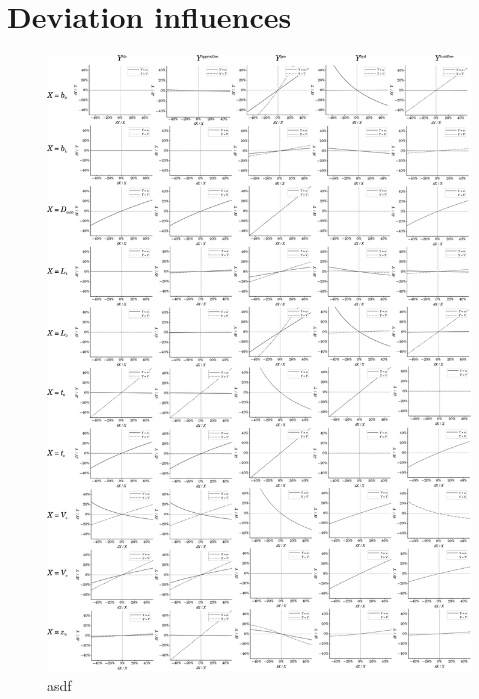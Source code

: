 \section*{Deviation influences}
\begin{figure}[H]
  \begin{center}
    \includegraphics[width=.925\linewidth]{./images/deltaAnalysis.pdf}
  \end{center}
  \vspace*{-3ex}
  \caption[asdf]{asdf}
  \label{fig:DeviationAnalysis}
\end{figure}
\FloatBarrier
\restoregeometry

